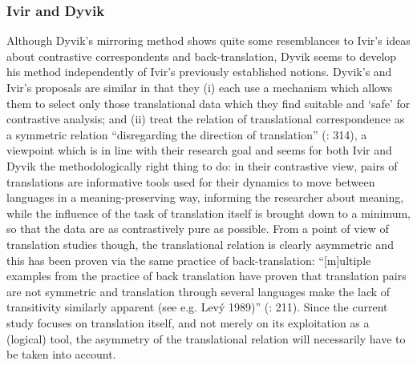 \subsubsection{\label{sec:2.3.4.3}  Ivir and Dyvik} 

Although Dyvik’s mirroring method shows quite some resemblances to Ivir’s ideas about contrastive correspondents and back-translation, Dyvik seems to develop his method independently of Ivir’s previously established notions. Dyvik’s and Ivir’s proposals are similar in that they (i) each use a mechanism which allows them to select only those translational data which they find suitable and ‘safe’ for contrastive analysis; and (ii) treat the relation of translational correspondence as a symmetric relation “disregarding the direction of translation” (\citealt{aijmer_translations_2004}: 314), a viewpoint which is in line with their research goal and seems for both Ivir and Dyvik the methodologically right thing to do: in their contrastive view, pairs of translations are informative tools used for their dynamics to move between languages in a meaning-preserving way, informing the researcher about meaning, while the influence of the task of translation itself is brought down to a minimum, so that the data are as contrastively pure as possible. From a point of view of translation studies though, the translational relation is clearly asymmetric and this has been proven via the same practice of back-translation: “[m]ultiple examples from the practice of back translation have proven that translation pairs are not symmetric and translation through several languages make the lack of transitivity similarly apparent (see e.g. Levý 1989)” (\citealt{halverson_concept_1997}: 211). Since the current study focuses on translation itself, and not merely on its exploitation as a (logical) tool, the asymmetry of the translational relation will necessarily have to be taken into account.



